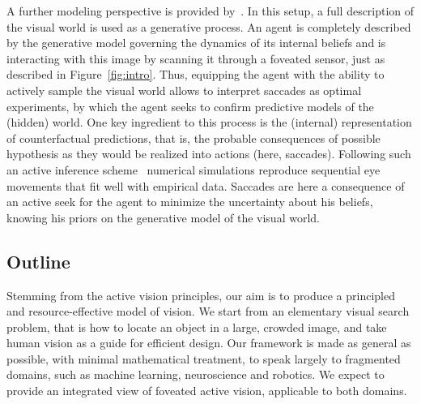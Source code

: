 A further modeling perspective is {\color{red} provided by~\cite{Friston12}}. In this setup, a full description of the visual world is used as a generative process. An agent is completely described by the generative model governing the dynamics of its internal beliefs and is interacting with this image by scanning it through a foveated sensor, just as described in Figure~\ref{fig:intro}. Thus, equipping the agent with the ability to actively sample the visual world %
allows to interpret saccades as optimal experiments, by which the agent seeks to confirm predictive models of the (hidden) world. One key ingredient to this process is the (internal) representation of counterfactual predictions, that is, the probable consequences of possible hypothesis as they would be realized into actions (here, saccades). Following such an active inference scheme~\cite{Mirza18} numerical simulations reproduce sequential eye movements that fit well with empirical data. %
Saccades %
are here a consequence of an active seek for the agent to minimize the uncertainty about his beliefs, knowing his priors on the generative model of the visual world.

\subsection*{Outline}


Stemming from the active vision principles, our aim is to produce a principled and resource-effective model of vision.
We start from an elementary visual search problem, that is how to locate an object in a large, crowded image, and take human vision as a guide for efficient design. Our framework is made as general as possible, with minimal mathematical treatment, to speak largely to fragmented domains, such as machine learning, neuroscience and robotics. We expect to provide an integrated view of foveated active vision, applicable to both domains.

